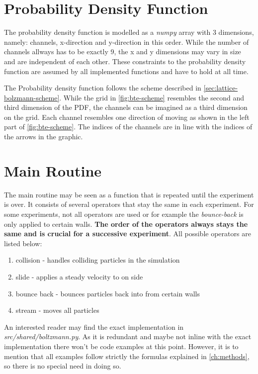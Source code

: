 \section{Probability Density Function}
The probability density function is modelled as a \textit{numpy} array with 3 dimensions, namely: channels, x-direction and y-direction in this order.
While the number of channels allways has to be exactly 9, the x and y dimensions may vary in size and are independent of each other.
These constraints to the probability density function are assumed by all implemented functions and have to hold at all time.
\newline

The Probability density function follows the scheme described in \cref{sec:lattice-bolzmann-scheme}.
While the grid in \cref{fig:bte-scheme} resembles the second and third dimension of the PDF, the channels can be imagined as a third dimension on the grid.
Each channel resembles one direction of moving as shown in the left part of \cref{fig:bte-scheme}.
The indices of the channels are in line with the indices of the arrows in the graphic.


\section{Main Routine}\label{sec:main-routine}
The main routine may be seen as a function that is repeated until the experiment is over.
It consists of several operators that stay the same in each experiment.
For some experiments, not all operators are used or for example the \textit{bounce-back} is only applied to certain walls.
\textbf{The order of the operators always stays the same and is crucial for a successive experiment}.
All possible operators are listed below:
\begin{enumerate}
    \item collision - handles colliding particles in the simulation
    \item slide - applies a steady velocity to on side
    \item bounce back - bounces particles back into from certain walls
    \item stream - moves all particles
\end{enumerate}

An interested reader may find the exact implementation in \textit{src/shared/boltzmann.py}.
As it is redundant and maybe not inline with the exact implementation there won't be code examples at this point.
However, it is to mention that all examples follow strictly the formulas explained in \cref{ch:methods}, so there is no special need in doing so.


